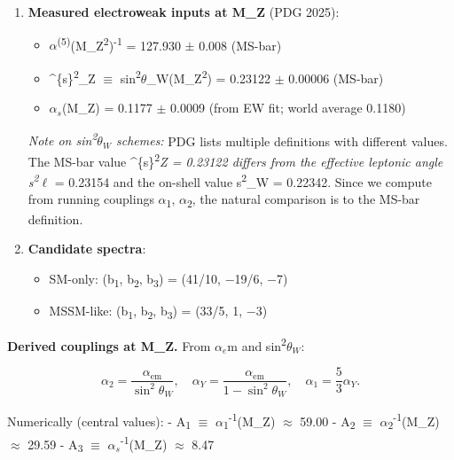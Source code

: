 \documentclass[11pt,a4paper]{article}
\theoremstyle{remark}
\providecommand{\tightlist}{%
  \setlength{\itemsep}{0pt}\setlength{\parskip}{0pt}}
\begin{document}
\begin{enumerate}
\def\labelenumi{\arabic{enumi}.}
\setcounter{enumi}{2}
\item
  \textbf{Measured electroweak inputs at M\_Z} (PDG 2025):

  \begin{itemize}
  \tightlist
  \item
    \ensuremath{\alpha}\textsuperscript{(5)}(M\_Z\textsuperscript{2})\textsuperscript{-1} = 127.930 \ensuremath{\pm} 0.008 (MS-bar)
  \item
    \^{}\{s\}\textsuperscript{2}\_Z \ensuremath{\equiv} sin\textsuperscript{2}\ensuremath{\theta}\_W(M\_Z\textsuperscript{2}) = 0.23122 \ensuremath{\pm} 0.00006 (MS-bar)
  \item
    \(\alpha_s\)(M\_Z) = 0.1177 \ensuremath{\pm} 0.0009 (from EW fit; world average 0.1180)
  \end{itemize}

  \emph{Note on sin\textsuperscript{2}\(\theta_W\) schemes:} PDG lists multiple definitions with different values.
  The MS-bar value \^{}\{s\}\textsuperscript{2}\emph{Z = 0.23122 differs from the effective leptonic angle
  s\textsuperscript{2}}\ensuremath{\ell} = 0.23154 and the on-shell value s\textsuperscript{2}\_W = 0.22342. Since we compute from
  running couplings \ensuremath{\alpha}\textsubscript{1}, \ensuremath{\alpha}\textsubscript{2}, the natural comparison is to the MS-bar definition.
\item
  \textbf{Candidate spectra}:

  \begin{itemize}
  \tightlist
  \item
    SM-only: (b\textsubscript{1}, b\textsubscript{2}, b\textsubscript{3}) = (41/10, \ensuremath{-}19/6, \ensuremath{-}7)
  \item
    MSSM-like: (b\textsubscript{1}, b\textsubscript{2}, b\textsubscript{3}) = (33/5, 1, \ensuremath{-}3)
  \end{itemize}
\end{enumerate}

\textbf{Derived couplings at M\_Z.} From \(\alpha{}_e\)m and sin\textsuperscript{2}\(\theta_W\):

\[
\alpha_2 = \frac{\alpha_{\mathrm{em}}}{\sin^2\theta_W}, \quad
\alpha_Y = \frac{\alpha_{\mathrm{em}}}{1 - \sin^2\theta_W}, \quad
\alpha_1 = \frac{5}{3}\alpha_Y.
\]

Numerically (central values):
- A\textsubscript{1} \ensuremath{\equiv} \ensuremath{\alpha}\textsubscript{1}\textsuperscript{-1}(M\_Z) \ensuremath{\approx} 59.00
- A\textsubscript{2} \ensuremath{\equiv} \ensuremath{\alpha}\textsubscript{2}\textsuperscript{-1}(M\_Z) \ensuremath{\approx} 29.59
- A\textsubscript{3} \ensuremath{\equiv} \(\alpha_s\)\textsuperscript{-1}(M\_Z) \ensuremath{\approx} 8.47
\end{document}
